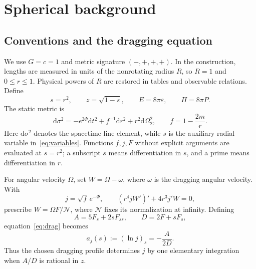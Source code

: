 \documentclass[aps,prd,reprint,a4paper,nofootinbib,floatfix]{revtex4-2}
\newcommand{\dd}{\mathrm d}
\begin{document}
\section{Spherical background}
\subsection{Conventions and the dragging equation}
We use $G=c=1$ and metric signature $(-,+,+,+)$. In the construction, lengths are measured in units of the nonrotating radius $R$, so $R=1$ and $0\le r\le1$. Physical powers of $R$ are restored in tables and observable relations. Define
\begin{equation}
 s=r^2,\qquad z=\sqrt{1-s},\qquad
 E=8\pi\varepsilon,\qquad \Pi=8\pi P.
 \label{eq:variables}
\end{equation}
The static metric is
\begin{equation}
 \dd\sigma^2=-e^{2\Phi}\dd t^2+f^{-1}\dd r^2+r^2\dd\Omega_2^2,
 \qquad f=1-\frac{2m}{r}.
 \label{eq:staticmetric}
\end{equation}
Here $\dd\sigma^2$ denotes the spacetime line element, while $s$ is the auxiliary radial variable in~\eqref{eq:variables}. Functions $f,j,F$ without explicit arguments are evaluated at $s=r^2$; a subscript $s$ means differentiation in $s$, and a prime means differentiation in $r$.

For angular velocity $\Omega$, set $W=\Omega-\omega$, where $\omega$ is the dragging angular velocity. With
\begin{equation}
 j=\sqrt f\,e^{-\Phi},
 \qquad (r^4jW')'+4r^3j'W=0,
 \label{eq:drag}
\end{equation}
prescribe $W=\Omega F/\mathcal N$, where $\mathcal N$ fixes its normalization at infinity. Defining
\begin{equation}
 A=5F_s+2sF_{ss},\qquad D=2F+sF_s,
 \label{eq:AD}
\end{equation}
equation~\eqref{eq:drag} becomes
\begin{equation}
 a_j(s):=(\ln j)_s=-\frac{A}{2D}.
 \label{eq:a}
\end{equation}
Thus the chosen dragging profile determines $j$ by one elementary integration when $A/D$ is rational in $z$.
\end{document}
